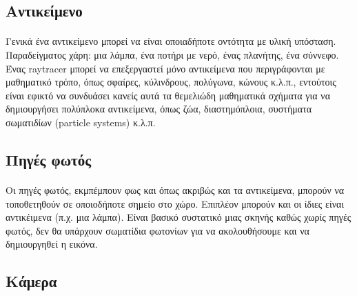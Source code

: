 \begin{sloppypar}
\subsection{Αντικείμενο}
\paragraph{}
	Γενικά ένα αντικείμενο μπορεί να είναι οποιαδήποτε οντότητα με υλική υπόσταση. Παραδείγματος χάρη: 
μια λάμπα, ένα ποτήρι με νερό, ένας πλανήτης, ένα σύννεφο. Ένας raytracer μπορεί να επεξεργαστεί μόνο 
αντικείμενα που περιγράφονται με μαθηματικό τρόπο, όπως σφαίρες, κύλινδρους, πολύγωνα, κώνους κ.λ.π., 
εντούτοις είναι εφικτό να συνδυάσει κανείς αυτά τα θεμελιώδη μαθηματικά σχήματα για να δημιουργήσει 
πολύπλοκα αντικείμενα, όπως ζώα, διαστημόπλοια, συστήματα σωματιδίων (particle systems) κ.λ.π.

\subsection{Πηγές φωτός}
\paragraph{}
	Οι πηγές φωτός, εκμπέμπουν φως και όπως ακριβώς και τα αντικείμενα, μπορούν να τοποθετηθούν σε
οποιοδήποτε σημείο στο χώρο. Επιπλέον μπορούν και οι ίδιες είναι αντικέιμενα (π.χ. μια λάμπα). Είναι βασικό 
συστατικό μιας σκηνής καθώς χωρίς πηγές φωτός, δεν θα υπάρχουν σωματίδια φωτονίων για να ακολουθήσουμε και 
να δημιουργηθεί η εικόνα.

\subsection{Κάμερα}

\end{sloppypar}

